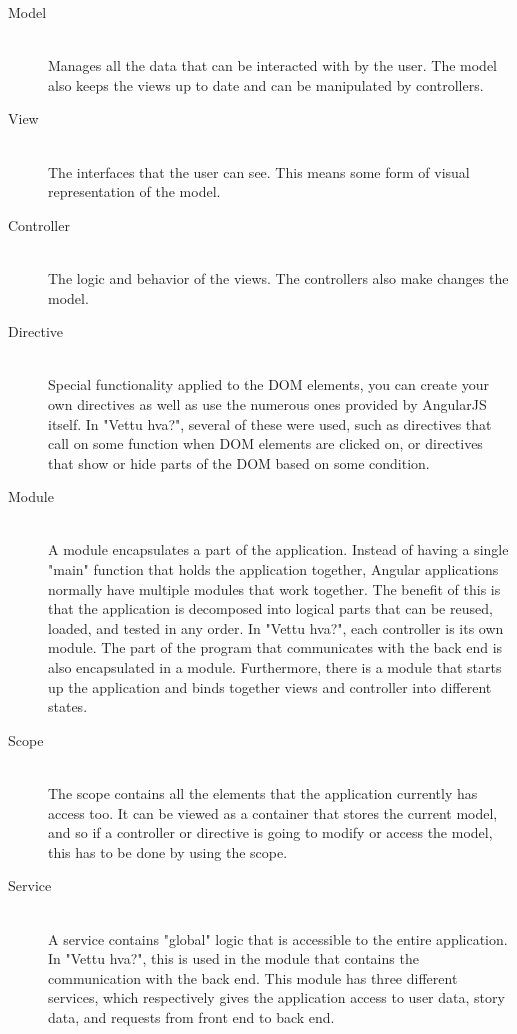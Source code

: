 \begin{description}
	\item[Model] \hfill \\ 
	Manages all the data that can be interacted with by the user. The model also keeps the views up to date and can be manipulated by controllers.
	
	\item[View] \hfill \\ 
	The interfaces that the user can see. This means some form of visual representation of the model.
	
	\item[Controller] \hfill \\ 
	The logic and behavior of the views. The controllers also make changes the model.
	
	\item[Directive] \hfill \\ 
	Special functionality applied to the DOM elements, you can create your own directives as well as use the numerous ones provided by AngularJS itself. In "Vettu hva?", several of these were used, such as directives that call on some function when DOM elements are clicked on, or directives that show or hide parts of the DOM based on some condition.
	
	\item[Module] \hfill \\ 
	A module encapsulates a part of the application. Instead of having a single "main" function that holds the application together, Angular applications normally have multiple modules that work together. The benefit of this is that the application is decomposed into logical parts that can be reused, loaded, and tested in any order. In "Vettu hva?", each controller is its own module. The part of the program that communicates with the back end is also encapsulated in a module. Furthermore, there is a module that starts up the application and binds together views and controller into different states.
	
	\item[Scope] \hfill \\ 
	The scope contains all the elements that the application currently has access too. It can be viewed as a container that stores the current model, and so if a controller or directive is going to modify or access the model, this has to be done by using the scope.
	
	\item[Service] \hfill \\ 
	A service contains "global" logic that is accessible to the entire application. In "Vettu hva?", this is used in the module that contains the communication with the back end. This module has three different services, which respectively gives the application access to user data, story data, and requests from front end to back end.
\end{description}

